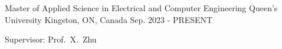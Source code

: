 

\begin{cventries}

  \cventry
    {Master of Applied Science in Electrical and Computer Engineering} %
    {Queen's University} %
    {Kingston, ON, Canada} %
    {Sep. 2023 - PRESENT} %
    {
      \begin{cvitems}
        \item{
          Supervisor: Prof.~X.~Zhu
        }
      \end{cvitems}
    }



\end{cventries}
